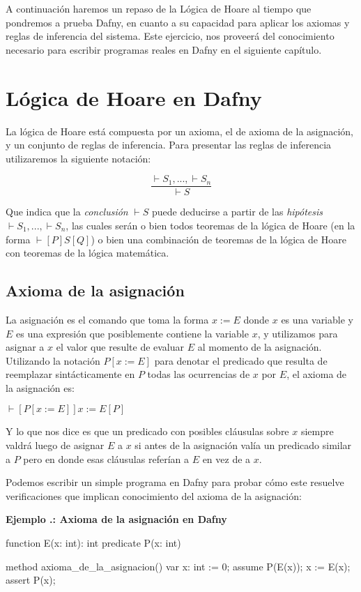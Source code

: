 \documentclass[12pt, a4paper, openany, fleqn]{book}
\newcounter{example}[chapter]
\renewcommand{\theexample}{\thechapter.\arabic{example}}
\newcommand{\example}[1]{
  \refstepcounter{example} %
  \vspace{1em}
  \noindent\textbf{Ejemplo \theexample: #1}
}
\newcommand{\hoareTheorem}[3]{\ensuremath{\vdash[#1]#2[#3]}}
\newcommand{\inferenceRule}[2]{
    \begin{equation*}
        \frac{#1}{#2}
    \end{equation*}
}
\begin{document}
    A continuación haremos un repaso de la Lógica de Hoare al tiempo que pondremos a prueba Dafny, en cuanto a su capacidad para aplicar los axiomas y reglas de inferencia del sistema. Este ejercicio, nos proveerá del conocimiento necesario para escribir programas reales en Dafny en el siguiente capítulo.

    \section{Lógica de Hoare en Dafny}
    La lógica de Hoare está compuesta por un axioma, el de axioma de la asignación, y un conjunto de reglas de inferencia. Para presentar las reglas de inferencia utilizaremos la siguiente notación:
    \inferenceRule{\vdash S_1, ..., \vdash S_n}{\vdash S}
    Que indica que la \textit{conclusión} $\vdash S$ puede deducirse a partir de las \textit{hipótesis} $\vdash S_1, ..., \vdash S_n$, las cuales serán o bien todos teoremas de la lógica de Hoare (en la forma $\vdash[P]S[Q]$) o bien una combinación de teoremas de la lógica de Hoare con teoremas de la lógica matemática.

    \subsection*{Axioma de la asignación}
    La asignación es el comando que toma la forma $x := E$ donde $x$ es una variable y $E$ es una expresión que posiblemente contiene la variable $x$, y utilizamos para asignar a $x$ el valor que resulte de evaluar $E$ al momento de la asignación. Utilizando la notación $P[x:=E]$ para denotar el predicado que resulta de reemplazar sintácticamente en $P$ todas las ocurrencias de $x$ por $E$, el axioma de la asignación es:
    \begin{center}
        \hoareTheorem{P[x:=E]}{x:=E}{P}
    \end{center}

    Y lo que nos dice es que un predicado con posibles cláusulas sobre $x$ siempre valdrá  luego de asignar $E$ a $x$ si antes de la asignación valía un predicado similar a $P$ pero en donde esas cláusulas referían a $E$ en vez de a $x$.

    Podemos escribir un simple programa en Dafny para probar cómo este resuelve verificaciones que implican conocimiento del axioma de la asignación:

    \example{Axioma de la asignación en Dafny}
    \begin{dafny}
function E(x: int): int
predicate P(x: int)

method axioma_de_la_asignacion()
{
    var x: int := 0;
    assume P(E(x));
    x := E(x);
    assert P(x);
}
    \end{dafny}
\end{document}
